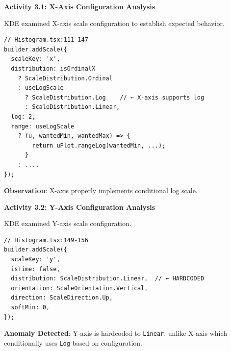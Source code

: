 \documentclass[
    11pt,
    a4paper,
    oneside,
    parskip=full,
    headings=big,
    bibliography=totoc
]{scrartcl}
\newcommand{\code}[1]{\texttt{#1}}
\begin{document}
\begin{actionbox}
    \textbf{Activity 3.1: X-Axis Configuration Analysis}
    
    KDE examined X-axis scale configuration to establish expected behavior.
    
    \vspace{0.3cm}
    \begin{evidencebox}
    \begin{verbatim}
// Histogram.tsx:111-147
builder.addScale({
  scaleKey: 'x',
  distribution: isOrdinalX
    ? ScaleDistribution.Ordinal
    : useLogScale
      ? ScaleDistribution.Log    // ← X-axis supports log
      : ScaleDistribution.Linear,
  log: 2,
  range: useLogScale
    ? (u, wantedMin, wantedMax) => {
        return uPlot.rangeLog(wantedMin, ...);
      }
    : ...,
});
    \end{verbatim}
    \end{evidencebox}
    
    \vspace{0.3cm}
    \textbf{Observation}: X-axis properly implements conditional log scale.
\end{actionbox}

\begin{actionbox}
    \textbf{Activity 3.2: Y-Axis Configuration Analysis}
    
    KDE examined Y-axis scale configuration.
    
    \vspace{0.3cm}
    \begin{evidencebox}
    \begin{verbatim}
// Histogram.tsx:149-156
builder.addScale({
  scaleKey: 'y',
  isTime: false,
  distribution: ScaleDistribution.Linear,  // ← HARDCODED
  orientation: ScaleOrientation.Vertical,
  direction: ScaleDirection.Up,
  softMin: 0,
});
    \end{verbatim}
    \end{evidencebox}
    
    \vspace{0.3cm}
    \textbf{Anomaly Detected}: Y-axis is hardcoded to \code{Linear}, unlike 
    X-axis which conditionally uses \code{Log} based on configuration.
\end{actionbox}
\end{document}
